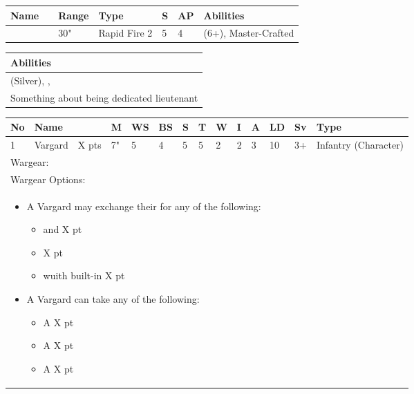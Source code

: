 \noindent
\begin{tabular}{||m{110pt} m{30pt} m{31pt} m{55pt} m{12pt} m{12pt} m{210pt}||}
	\hline
	Name & & Range & Type & S & AP & Abilities \\
	\hline
	\quickref{Relic Gauss Blaster} & & 30" & Rapid Fire 2 & 5 & 4 & \quickref{Gauss} (6+), Master-Crafted \\
	\hline
\end{tabular}

\noindent
\begin{tabular}{||m{532pt}||}
	\hline
	Abilities \\
	\hline
	\quickref{Awakening Protocols}(Silver), \quickref{Living Metal}, \quickref{Reanimation Protocols} \\
	Something about being dedicated lieutenant \\
	\hline
\end{tabular}



\newpage
{}

\noindent
\begin{tabular}{||m{10pt} m{95pt} m{30pt} m{11pt} m{11pt} m{11pt} m{11pt} m{11pt} m{11pt} m{11pt} m{11pt} m{11pt} m{11pt} m{125pt}||}
	\hline
	No & Name & & M & WS & BS & S & T & W & I & A & LD & Sv & Type \\
	\hline
	1 & Vargard & X pts & 7" & 5 & 4 & 5 & 5 & 2 & 2 & 3 & 10 & 3+ & Infantry (Character)\\
	\hline
	\hline
	\multicolumn{14}{||Z{532 pt}||}{Wargear: \quickref{Warscythe}}\\
	\multicolumn{14}{||Z{532 pt}||}{Wargear Options:} \\		
	\multicolumn{14}{||Z{532 pt}||}{\begin{itemize}
			\item A Vargard may exchange their \quickref{Warscythe} for any of the following:
			\begin{itemize}
				\item \quickref{Hyperphase Sword} and \quickref{Dispersion Shield}\hrulefill X pt
				\item \quickref{Relic Gauss Blaster} \hrulefill X pt
				\item \quickref{Warscythe} wuith built-in \quickref{Relic Gauss Blaster} \hrulefill X pt
			\end{itemize}\item A Vargard can take any of the following:
			\begin{itemize}
				\item A \quickref{Phase Shifter} \hrulefill X pt
				\item A \quickref{Phylactery} \hrulefill X pt
				\item A \quickref{Sempiternal Weave} \hrulefill X pt
			\end{itemize}
	\end{itemize}} \\	
	\hline
\end{tabular}

